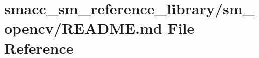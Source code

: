 \hypertarget{smacc__sm__reference__library_2sm__opencv_2README_8md}{}\section{smacc\+\_\+sm\+\_\+reference\+\_\+library/sm\+\_\+opencv/\+R\+E\+A\+D\+ME.md File Reference}
\label{smacc__sm__reference__library_2sm__opencv_2README_8md}
